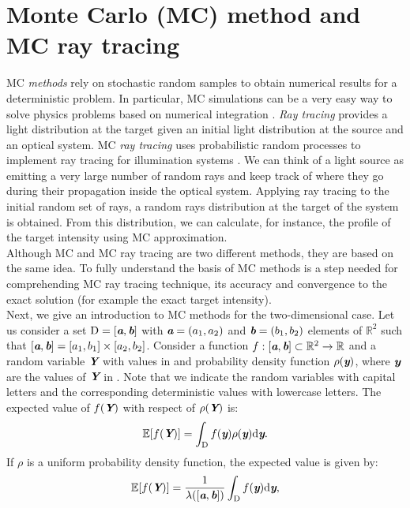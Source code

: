 \section{Monte Carlo (MC) method and MC ray tracing}
MC \textit{methods} rely on stochastic random samples to obtain numerical results for a deterministic problem. In particular, MC simulations can be a very easy way to solve physics problems based on numerical integration \cite{jensen2003monte}. \textit{Ray tracing} provides a light distribution at the target given an initial light distribution at the source and an optical system.
MC \textit{ray tracing} uses probabilistic random processes to implement ray tracing for illumination systems \cite{leobacher2014introduction}.
We can think of a light source as
emitting a very large number of random rays and keep track of where they go during their propagation inside the optical system. 
Applying ray tracing to the initial random set of rays, a random rays distribution at the target of the system is obtained. From this distribution, we can calculate, for instance, the profile of the target intensity using MC approximation.  
\\ \indent Although MC and MC ray tracing are two different methods, they are based on the same idea. To fully understand the basis of MC methods is a step needed for comprehending MC ray tracing technique, its accuracy and convergence to the exact solution (for example the exact target intensity).
\\ \indent Next, we give an introduction to MC methods for the two-dimensional case. Let us consider a set $\mbox{$\textup{D}$} = [\textit{\textbf{a}}, \textit{\textbf{b}}]$ with $\textit{\textbf{a}} = (a_1, a_2)$ and $\textit{\textbf{b}} = (b_1, b_2)$ elements of $\mathbb{R}^2$ such that
$[\textit{\textbf{a}}, \textit{\textbf{b}}]  = [a_1, b_1] \times [a_2, b_2]$. Consider a function $f:[\textit{\textbf{a}},\textit{\textbf{b}}]\subset \mathbb{R}^2 \rightarrow \mathbb{R}$ and a random variable $\textit{\textbf{Y}}$ with values in  and probability density function $\rho(\textit{\textbf{y}})$, where $\textit{\textbf{y}}$ are the values of $\textit{\textbf{Y}}$ in . Note that we indicate the random variables with capital letters and the corresponding deterministic values with lowercase letters. The expected value of $f(\textit{\textbf{Y}})$ with respect of $\rho(\textit{\textbf{Y}})$ is:
\begin{equation}
\mathbb{E}[f(\textit{\textbf{Y}})] =\int_{\textup{D}}f(\textit{\textbf{y}})\rho(\textit{\textbf{y}}) \textrm{d}\textit{\textbf{y}}.
\end{equation}
If $\rho$ is a uniform probability density function, the expected value is given by:
\begin{equation}\label{eq:expected_value}
\mathbb{E}[f(\textit{\textbf{Y}})] =\frac{1}{\lambda([\textit{\textbf{a}},\textit{\textbf{b}}])} \int_{\textup{D}}f(\textit{\textbf{y}}) \textrm{d}\textit{\textbf{y}},
\end{equation}
